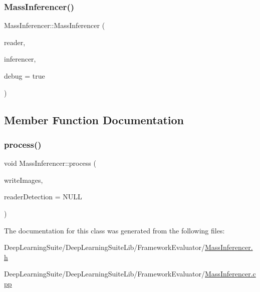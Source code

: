 \mbox{\label{class_mass_inferencer_a785c29013dd824096d2cf5992d5a1f86}} 
\subsubsection{\texorpdfstring{Mass\+Inferencer()}{MassInferencer()}\hspace{0.1cm}{\footnotesize\ttfamily [5/5]}}
{\footnotesize\ttfamily Mass\+Inferencer\+::\+Mass\+Inferencer (\begin{DoxyParamCaption}\item[{\hyperlink{_dataset_reader_8h_a30d89cba514a220d64d04535c0465f1c}{Dataset\+Reader\+Ptr}}]{reader,  }\item[{\hyperlink{_framework_inferencer_8h_a7b59ebc4b080d1be0d1a6240703011f2}{Framework\+Inferencer\+Ptr}}]{inferencer,  }\item[{bool}]{debug = {\ttfamily true} }\end{DoxyParamCaption})}



\subsection{Member Function Documentation}
\mbox{\label{class_mass_inferencer_a64197fd7172177a03d5e87f5dbf37dc3}} 
\subsubsection{\texorpdfstring{process()}{process()}}
{\footnotesize\ttfamily void Mass\+Inferencer\+::process (\begin{DoxyParamCaption}\item[{bool}]{write\+Images,  }\item[{\hyperlink{_dataset_reader_8h_a30d89cba514a220d64d04535c0465f1c}{Dataset\+Reader\+Ptr}}]{reader\+Detection = {\ttfamily NULL} }\end{DoxyParamCaption})}



The documentation for this class was generated from the following files\+:\begin{DoxyCompactItemize}
\item 
Deep\+Learning\+Suite/\+Deep\+Learning\+Suite\+Lib/\+Framework\+Evaluator/\hyperlink{_mass_inferencer_8h}{Mass\+Inferencer.\+h}\item 
Deep\+Learning\+Suite/\+Deep\+Learning\+Suite\+Lib/\+Framework\+Evaluator/\hyperlink{_mass_inferencer_8cpp}{Mass\+Inferencer.\+cpp}\end{DoxyCompactItemize}
